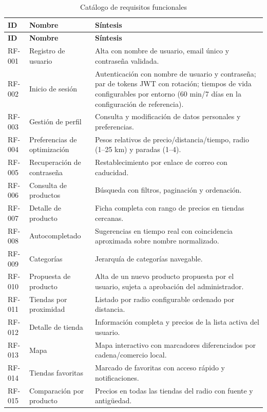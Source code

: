\begin{small}
\begin{longtable}{@{}p{2.1cm}p{4.2cm}p{7.6cm}@{}}
\caption{Cat\'alogo de requisitos funcionales}\label{tab:rf-catalogo}\\
\toprule
\textbf{ID} & \textbf{Nombre} & \textbf{S\'intesis} \\
\midrule
\endfirsthead
\toprule
\textbf{ID} & \textbf{Nombre} & \textbf{S\'intesis} \\
\midrule
\endhead
\bottomrule
\endfoot
RF-001 & Registro de usuario & Alta con nombre de usuario, email \'unico y contrase\~na validada. \\
RF-002 & Inicio de sesi\'on & Autenticaci\'on con nombre de usuario y contrase\~na; par de tokens JWT con rotaci\'on; tiempos de vida configurables por entorno (60 min/7 d\'ias en la configuraci\'on de referencia). \\
RF-003 & Gesti\'on de perfil & Consulta y modificaci\'on de datos personales y preferencias. \\
RF-004 & Preferencias de optimizaci\'on & Pesos relativos de precio/distancia/tiempo, radio (1--25 km) y paradas (1--4). \\
RF-005 & Recuperaci\'on de contrase\~na & Restablecimiento por enlace de correo con caducidad. \\
RF-006 & Consulta de productos & B\'usqueda con filtros, paginaci\'on y ordenaci\'on. \\
RF-007 & Detalle de producto & Ficha completa con rango de precios en tiendas cercanas. \\
RF-008 & Autocompletado & Sugerencias en tiempo real con coincidencia aproximada sobre nombre normalizado. \\
RF-009 & Categor\'ias & Jerarqu\'ia de categor\'ias navegable. \\
RF-010 & Propuesta de producto & Alta de un nuevo producto propuesta por el usuario, sujeta a aprobaci\'on del administrador. \\
RF-011 & Tiendas por proximidad & Listado por radio configurable ordenado por distancia. \\
RF-012 & Detalle de tienda & Informaci\'on completa y precios de la lista activa del usuario. \\
RF-013 & Mapa & Mapa interactivo con marcadores diferenciados por cadena/comercio local. \\
RF-014 & Tiendas favoritas & Marcado de favoritas con acceso r\'apido y notificaciones. \\
RF-015 & Comparaci\'on por producto & Precios en todas las tiendas del radio con fuente y antig\"uedad. \\

\end{longtable}
\end{small}
